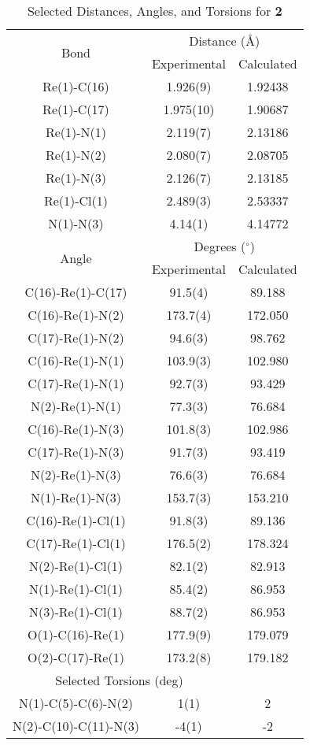 \begin{table}[htbp]
  \caption{Selected Distances, Angles, and Torsions for \textbf{2}}
  \centering
    \begin{tabular}{ccc}
    \toprule
    \multirow{2}{*}{Bond} & \multicolumn{2}{c}{Distance (\r{A})} \\ \cline{2-3}
     & Experimental & Calculated \\ \midrule
    Re(1)-C(16) & 1.926(9) & 1.92438\\
    Re(1)-C(17) & 1.975(10) & 1.90687\\
    Re(1)-N(1) & 2.119(7) & 2.13186\\
    Re(1)-N(2) & 2.080(7) & 2.08705\\
    Re(1)-N(3) & 2.126(7) & 2.13185\\
    Re(1)-Cl(1) & 2.489(3) & 2.53337 \\
    N(1)-N(3) & 4.14(1) & 4.14772 \\ \midrule
    \multirow{2}{*}{Angle} & \multicolumn{2}{c}{Degrees ($^\circ$)} \\ \cline{2-3}
     & Experimental & Calculated \\ \midrule
    C(16)-Re(1)-C(17) & 91.5(4) & 89.188 \\
    C(16)-Re(1)-N(2) & 173.7(4) & 172.050 \\
    C(17)-Re(1)-N(2) & 94.6(3) & 98.762 \\
    C(16)-Re(1)-N(1) & 103.9(3) & 102.980 \\
    C(17)-Re(1)-N(1) & 92.7(3) & 93.429 \\
    N(2)-Re(1)-N(1) & 77.3(3) & 76.684 \\
    C(16)-Re(1)-N(3) & 101.8(3) & 102.986 \\
    C(17)-Re(1)-N(3) & 91.7(3) & 93.419 \\
    N(2)-Re(1)-N(3) & 76.6(3) & 76.684 \\
    N(1)-Re(1)-N(3) & 153.7(3) & 153.210 \\
    C(16)-Re(1)-Cl(1) & 91.8(3) & 89.136 \\
    C(17)-Re(1)-Cl(1) & 176.5(2) & 178.324 \\
    N(2)-Re(1)-Cl(1) & 82.1(2) & 82.913 \\
    N(1)-Re(1)-Cl(1) & 85.4(2) & 86.953 \\
    N(3)-Re(1)-Cl(1) & 88.7(2) & 86.953 \\
    O(1)-C(16)-Re(1) & 177.9(9) & 179.079 \\
    O(2)-C(17)-Re(1) & 173.2(8) & 179.182 \\ \midrule
    \multicolumn{2}{c}{Selected Torsions (deg)} \\ \midrule
    N(1)-C(5)-C(6)-N(2) & 1(1) & 2 \\
    N(2)-C(10)-C(11)-N(3) & -4(1) & -2 \\
    \bottomrule
    \end{tabular}%
  \label{tab.da2}%
\end{table}%


